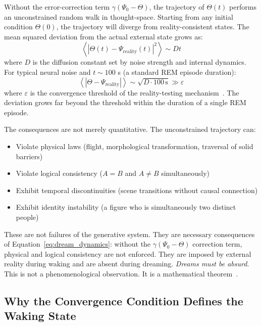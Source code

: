 Without the error-correction term $\gamma(\Psi_0 - \Theta)$, the trajectory of $\Theta(t)$ performs an unconstrained random walk in thought-space. Starting from any initial condition $\Theta(0)$, the trajectory will diverge from reality-consistent states. The mean squared deviation from the actual external state grows as:
%
\begin{equation}
\left\langle |\Theta(t) - \Psi_{\mathrm{reality}}(t)|^2 \right\rangle \sim Dt
\label{eq:divergence}
\end{equation}
%
where $D$ is the diffusion constant set by noise strength and internal dynamics. For typical neural noise and $t \sim 100$ s (a standard REM episode duration):
%
\begin{equation}
\left\langle |\Theta - \Psi_{\mathrm{reality}}| \right\rangle \sim \sqrt{D \cdot 100\,\mathrm{s}} \gg \varepsilon
\end{equation}
%
where $\varepsilon$ is the convergence threshold of the reality-testing mechanism~\cite{author_dream}. The deviation grows far beyond the threshold within the duration of a single REM episode.

The consequences are not merely quantitative. The unconstrained trajectory can:
%
\begin{itemize}
\item Violate physical laws (flight, morphological transformation, traversal of solid barriers)
\item Violate logical consistency ($A = B$ and $A \neq B$ simultaneously)
\item Exhibit temporal discontinuities (scene transitions without causal connection)
\item Exhibit identity instability (a figure who is simultaneously two distinct people)
\end{itemize}
%
These are not failures of the generative system. They are necessary consequences of Equation~\eqref{eq:dream_dynamics}: without the $\gamma(\Psi_0 - \Theta)$ correction term, physical and logical consistency are not enforced. They are imposed by external reality during waking and are absent during dreaming. \textit{Dreams must be absurd}. This is not a phenomenological observation. It is a mathematical theorem~\cite{author_dream}.

\subsection{Why the Convergence Condition Defines the Waking State}

